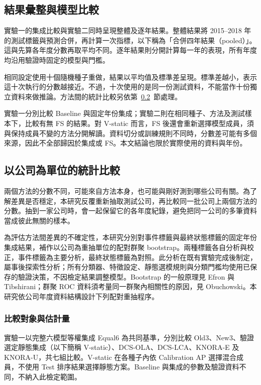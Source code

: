 \subsection{結果彙整與模型比較}

實驗一的集成比較與實驗二同時呈現整體及逐年結果。整體結果將 2015--2018 年的測試標籤與預測合併，再計算一次指標，以下稱為「合併四年結果（pooled）」。這與先算各年度分數再取平均不同。逐年結果則分開計算每一年的表現，所有年度均沿用驗證時固定的模型與門檻。

相同設定使用十個隨機種子重做，結果以平均值及標準差呈現。標準差越小，表示這十次執行的分數越接近。不過，十次使用的是同一份測試資料，不能當作十份獨立資料來做推論。方法間的統計比較另依第~\ref{sec:method-statistics}~節處理。

實驗一分別比較 Baseline 與固定年份集成；實驗二則在相同種子、方法及測試樣本下，比較有無 FS 的結果。對 V-static 而言，FS 後還會重新選擇模型成員，須與保持成員不變的方法分開解讀。資料切分或訓練規則不同時，分數差可能有多個來源，因此不全部歸因於集成或 FS。本文結論也限於實際使用的資料與年份。

\subsection{以公司為單位的統計比較}\label{sec:method-statistics}

兩個方法的分數不同，可能來自方法本身，也可能與剛好測到哪些公司有關。為了解差異是否穩定，本研究反覆重新抽取測試公司，再比較同一批公司上兩個方法的分數。抽到一家公司時，會一起保留它的各年度紀錄，避免把同一公司的多筆資料當成彼此無關的樣本。

為評估方法間差異的不確定性，本研究分別對事件標籤與最終狀態標籤的固定年份集成結果，補作以公司為重抽單位的配對群聚 bootstrap。兩種標籤各自分析與校正，事件標籤為主要分析，最終狀態標籤為對照。此分析在既有實驗完成後制定，屬事後探索性分析；所有分類器、特徵設定、靜態選模規則與分類門檻均使用已保存的驗證決策，不因檢定結果調整模型。Bootstrap 的一般原理見 Efron 與 Tibshirani\autocite{efron1986bootstrap}；群聚 ROC 資料須考量同一群聚內相關性的原因，見 Obuchowski\autocite{obuchowski1997clustered}。本研究依公司年度資料結構設計下列配對重抽程序。

\subsubsection{比較對象與估計量}

實驗一以完整六模型等權集成 Equal6 為共同基準，分別比較 Old3、New3、驗證選定靜態集成（以下簡稱 V-static）、DCS-OLA、DCS-LCA、KNORA-E 及 KNORA-U，共七組比較。V-static 在各種子內依 Calibration AP 選擇混合成員，不使用 Test 排序結果選擇靜態方案。Baseline 與集成的參數及驗證資料不同，不納入此檢定範圍。

